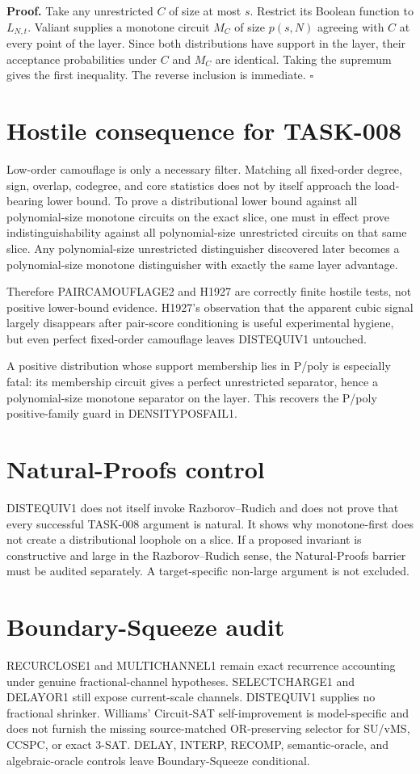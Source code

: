 \documentclass[11pt]{article}
\begin{document}
\textbf{Proof.}
Take any unrestricted \(C\) of size at most \(s\). Restrict its Boolean function to \(L_{N,t}\). Valiant supplies a monotone circuit \(M_C\) of size \(p(s,N)\) agreeing with \(C\) at every point of the layer. Since both distributions have support in the layer, their acceptance probabilities under \(C\) and \(M_C\) are identical. Taking the supremum gives the first inequality. The reverse inclusion is immediate. \(\square\)

\section*{Hostile consequence for TASK-008}
Low-order camouflage is only a necessary filter. Matching all fixed-order degree, sign, overlap, codegree, and core statistics does not by itself approach the load-bearing lower bound. To prove a distributional lower bound against all polynomial-size monotone circuits on the exact slice, one must in effect prove indistinguishability against all polynomial-size unrestricted circuits on that same slice. Any polynomial-size unrestricted distinguisher discovered later becomes a polynomial-size monotone distinguisher with exactly the same layer advantage.

Therefore PAIRCAMOUFLAGE2 and H1927 are correctly finite hostile tests, not positive lower-bound evidence. H1927's observation that the apparent cubic signal largely disappears after pair-score conditioning is useful experimental hygiene, but even perfect fixed-order camouflage leaves DISTEQUIV1 untouched.

A positive distribution whose support membership lies in P/poly is especially fatal: its membership circuit gives a perfect unrestricted separator, hence a polynomial-size monotone separator on the layer. This recovers the P/poly positive-family guard in DENSITYPOSFAIL1.

\section*{Natural-Proofs control}
DISTEQUIV1 does not itself invoke Razborov--Rudich and does not prove that every successful TASK-008 argument is natural. It shows why monotone-first does not create a distributional loophole on a slice. If a proposed invariant is constructive and large in the Razborov--Rudich sense, the Natural-Proofs barrier must be audited separately. A target-specific non-large argument is not excluded.

\section*{Boundary-Squeeze audit}
RECURCLOSE1 and MULTICHANNEL1 remain exact recurrence accounting under genuine fractional-channel hypotheses. SELECTCHARGE1 and DELAYOR1 still expose current-scale channels. DISTEQUIV1 supplies no fractional shrinker. Williams' Circuit-SAT self-improvement is model-specific and does not furnish the missing source-matched OR-preserving selector for SU/vMS, CCSPC, or exact 3-SAT. DELAY, INTERP, RECOMP, semantic-oracle, and algebraic-oracle controls leave Boundary-Squeeze conditional.
\end{document}
